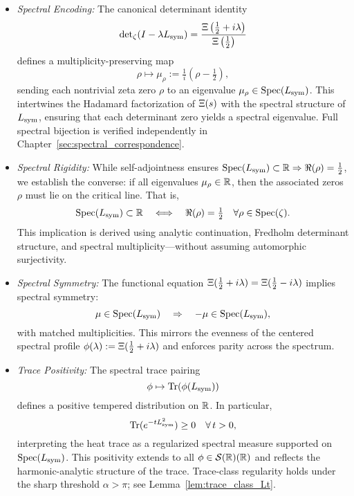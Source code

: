 \begin{itemize}
  \item \textit{Spectral Encoding:}  
  The canonical determinant identity
  \[
  \det\nolimits_{\zeta}(I - \lambda L_{\mathrm{sym}}) = \frac{\Xi\left(\tfrac{1}{2} + i\lambda\right)}{\Xi\left(\tfrac{1}{2}\right)}
  \]
  defines a multiplicity-preserving map
  \[
  \rho \mapsto \mu_\rho := \tfrac{1}{i}(\rho - \tfrac{1}{2}),
  \]
  sending each nontrivial zeta zero \( \rho \) to an eigenvalue \( \mu_\rho \in \operatorname{Spec}(L_{\mathrm{sym}}) \). This intertwines the Hadamard factorization of \( \Xi(s) \) with the spectral structure of \( L_{\mathrm{sym}} \), ensuring that each determinant zero yields a spectral eigenvalue. Full spectral bijection is verified independently in Chapter~\ref{sec:spectral_correspondence}.

  \item \textit{Spectral Rigidity:}  
  While self-adjointness ensures \( \operatorname{Spec}(L_{\mathrm{sym}}) \subset \mathbb{R} \Rightarrow \Re(\rho) = \tfrac{1}{2} \), we establish the converse: if all eigenvalues \( \mu_\rho \in \mathbb{R} \), then the associated zeros \( \rho \) must lie on the critical line. That is,
  \[
  \operatorname{Spec}(L_{\mathrm{sym}}) \subset \mathbb{R}
  \quad \Longleftrightarrow \quad
  \Re(\rho) = \tfrac{1}{2} \quad \forall \rho \in \operatorname{Spec}(\zeta).
  \]
  This implication is derived using analytic continuation, Fredholm determinant structure, and spectral multiplicity—without assuming automorphic surjectivity.

  \item \textit{Spectral Symmetry:}  
  The functional equation \( \Xi(\tfrac{1}{2} + i\lambda) = \Xi(\tfrac{1}{2} - i\lambda) \) implies spectral symmetry:
  \[
  \mu \in \operatorname{Spec}(L_{\mathrm{sym}}) \quad \Rightarrow \quad -\mu \in \operatorname{Spec}(L_{\mathrm{sym}}),
  \]
  with matched multiplicities. This mirrors the evenness of the centered spectral profile \( \phi(\lambda) := \Xi(\tfrac{1}{2} + i\lambda) \) and enforces parity across the spectrum.

  \item \textit{Trace Positivity:}  
  The spectral trace pairing
  \[
  \phi \mapsto \operatorname{Tr}(\phi(L_{\mathrm{sym}}))
  \]
  defines a positive tempered distribution on \( \mathbb{R} \). In particular,
  \[
  \operatorname{Tr}(e^{-t L_{\mathrm{sym}}^2}) \ge 0 \quad \forall\, t > 0,
  \]
  interpreting the heat trace as a regularized spectral measure supported on \( \operatorname{Spec}(L_{\mathrm{sym}}) \). This positivity extends to all \( \phi \in \mathcal{S}(\mathbb{R})(\mathbb{R}) \) and reflects the harmonic-analytic structure of the trace. Trace-class regularity holds under the sharp threshold \( \alpha > \pi \); see Lemma~\ref{lem:trace_class_Lt}.


\end{itemize}
